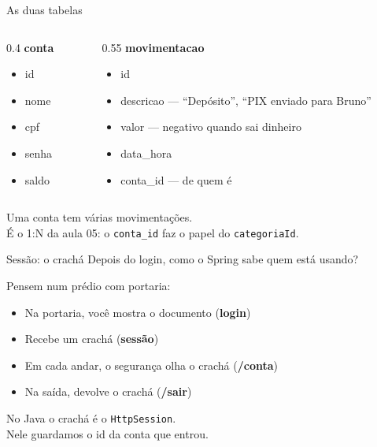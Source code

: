 \documentclass[aspectratio=169,11pt]{beamer}
\begin{document}
\begin{frame}{As duas tabelas}
  \begin{columns}[T]
    \begin{column}{0.4\textwidth}
      \textbf{conta}
      \begin{itemize}
        \item id
        \item nome
        \item cpf
        \item senha
        \item saldo
      \end{itemize}
    \end{column}
    \begin{column}{0.55\textwidth}
      \textbf{movimentacao}
      \begin{itemize}
        \item id
        \item descricao --- ``Depósito'', ``PIX enviado para Bruno''
        \item valor --- negativo quando sai dinheiro
        \item data\_hora
        \item conta\_id --- de quem é
      \end{itemize}
    \end{column}
  \end{columns}

  \vspace{0.6em}
  Uma conta tem várias movimentações.\\
  É o 1{:}N da aula 05: o \texttt{conta\_id} faz o papel do \texttt{categoriaId}.
\end{frame}

\begin{frame}{Sessão: o crachá}
  Depois do login, como o Spring sabe quem está usando?

  \vspace{0.5em}
  Pensem num prédio com portaria:
  \begin{itemize}
    \item Na portaria, você mostra o documento (\textbf{login})
    \item Recebe um crachá (\textbf{sessão})
    \item Em cada andar, o segurança olha o crachá (\textbf{/conta})
    \item Na saída, devolve o crachá (\textbf{/sair})
  \end{itemize}

  \vspace{0.5em}
  No Java o crachá é o \texttt{HttpSession}.\\
  Nele guardamos o id da conta que entrou.
\end{frame}
\end{document}
